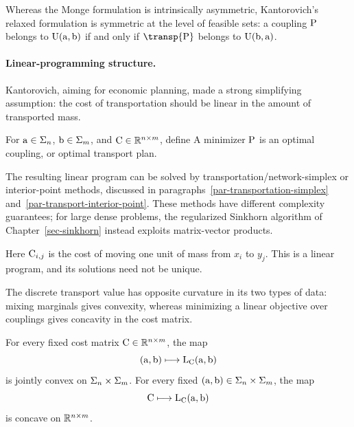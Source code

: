 Whereas the Monge formulation is intrinsically asymmetric, Kantorovich's relaxed formulation is symmetric at the level of feasible sets: a coupling $\P$ belongs to $\CouplingsD(\a,\b)$ if and only if $\transp{\P}$ belongs to $\CouplingsD(\b,\a)$.

\paragraph{Linear-programming structure.}

Kantorovich, aiming for economic planning, made a strong simplifying assumption: the cost of transportation should be linear in the amount of transported mass.
\begin{defn}\label{def-discrete-kantorovich-problem}
	For $\a\in\simplex_n$, $\b\in\simplex_m$, and $\C\in\RR^{n\times m}$, define
A minimizer $\P$ is an optimal coupling, or optimal transport plan.
\end{defn}
The resulting linear program can be solved by transportation/network-simplex or interior-point methods, discussed in paragraphs~\ref{par-transportation-simplex} and~\ref{par-transport-interior-point}. These methods have different complexity guarantees; for large dense problems, the regularized Sinkhorn algorithm of Chapter~\ref{sec-sinkhorn} instead exploits matrix-vector products.

Here $\C_{i,j}$ is the cost of moving one unit of mass from $x_i$ to $y_j$.
This is a linear program, and its solutions need not be unique.

The discrete transport value has opposite curvature in its two types of data: mixing marginals gives convexity, whereas minimizing a linear objective over couplings gives concavity in the cost matrix.
\begin{prop}\label{prop-discrete-kantorovich-joint-convexity}
	For every fixed cost matrix $\C\in\RR^{n\times m}$, the map
	\[
		(\a,\b)\longmapsto\MKD_{\C}(\a,\b)
	\]
	is jointly convex on $\simplex_n\times\simplex_m$. For every fixed $(\a,\b)\in\simplex_n\times\simplex_m$, the map
	\[
		\C\longmapsto\MKD_{\C}(\a,\b)
	\]
	is concave on $\RR^{n\times m}$.
\end{prop}

